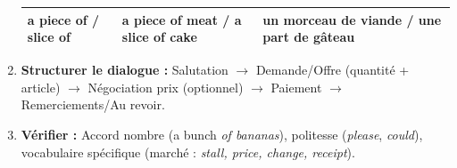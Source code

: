 \documentclass[11pt]{article}
\newcommand{\cle}[1]{{\popxbold\color{popdark}#1}}
\begin{document}
\begin{methode}
\begin{enumerate}
\begin{center}
\begin{tabular}{|l|l|l|}
                  a \cle{piece of} / \cle{slice of} & a piece of meat / a slice of cake & un morceau de viande / une part de gâteau \\ \hline
                  \end{tabular}
              \end{center}
        \item \textbf{Structurer le dialogue :} Salutation $\rightarrow$ Demande/Offre (quantité + article) $\rightarrow$ Négociation prix (optionnel) $\rightarrow$ Paiement $\rightarrow$ Remerciements/Au revoir.
        \item \textbf{Vérifier :} Accord nombre (a bunch \emph{of bananas}), politesse (\emph{please}, \emph{could}), vocabulaire spécifique (marché : \emph{stall, price, change, receipt}).
    \end{enumerate}
\end{methode}
\end{document}
